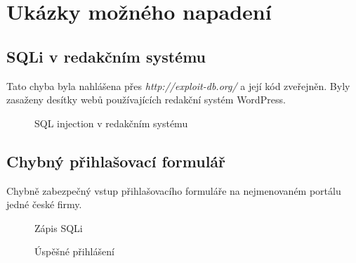 \documentclass[12pt, a4paper]{report}
\begin{document}
\section{Ukázky možného napadení}
\subsection{SQLi v redakčním systému}
Tato chyba byla nahlášena přes \textit{http://exploit-db.org/} a její kód zveřejněn. Byly zasaženy desítky webů používajících redakční systém WordPress.
\begin{figure}[h!]
\caption{SQL injection v redakčním systému}
\label{obr.squash}
\end{figure}

\subsection{Chybný přihlašovací formulář}
Chybně zabezpečný vstup přihlašovacího formuláře na nejmenovaném portálu jedné české firmy.
\begin{figure}[h!]
\caption{Zápis SQLi}
\label{obr.login1}
\end{figure}

\begin{figure}[h!]
\caption{Úspěšné přihlášení}
\label{obr.login2}
\end{figure}
\end{document}
